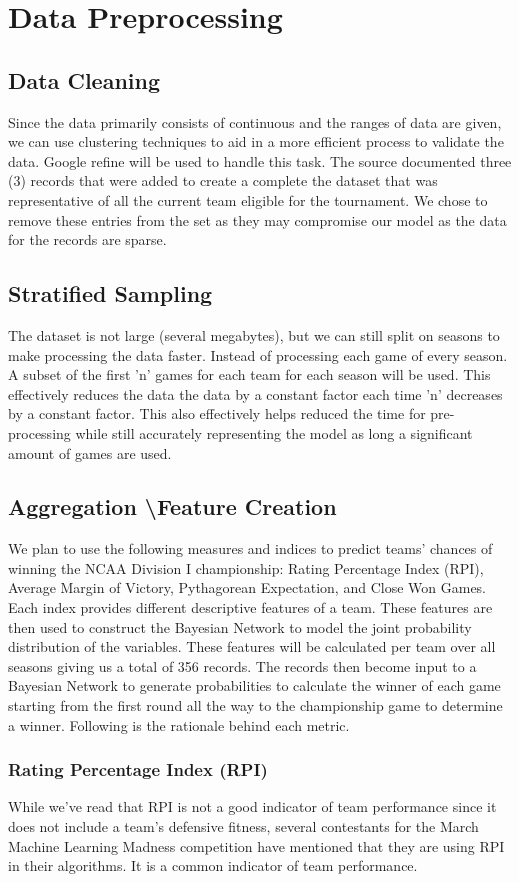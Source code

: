 \documentclass{acm_proc_article-sp}
\begin{document}
\section{Data Preprocessing}
\subsection{Data Cleaning}
Since the data primarily consists of continuous and the ranges of data are given, we can use 
clustering techniques to aid in a more efficient process to validate the data. Google refine will be 
used to handle this task. The source documented three (3) records that were added to create a 
complete the dataset that was representative of all the current team eligible for the tournament. We 
chose to remove these entries from the set as they may compromise our model as the data for the 
records are sparse.
\subsection{Stratified Sampling}
The dataset is not large (several megabytes), but we can still split on seasons to make processing 
the data faster. Instead of processing each game of every season. A subset of the first 'n' games 
for each team for each season will be used. This effectively reduces the data the data by a constant 
factor each time 'n' decreases by a constant factor. This also effectively helps reduced the time 
for pre-processing while still accurately representing the model as long a significant amount of 
games are used.
\subsection{Aggregation \textbackslash Feature Creation}
We plan to use the following measures and indices to predict teams' chances of winning the NCAA 
Division I championship: Rating Percentage Index (RPI), Average Margin of Victory, Pythagorean 
Expectation, and Close Won Games. Each index provides different descriptive features of a team. 
These features are then used to construct the Bayesian Network to model the joint probability 
distribution of the variables. These features will be calculated per team over all seasons giving us 
a total of 356 records. The records then become input to a Bayesian Network to generate 
probabilities to calculate the winner of each game starting from the first round all the way to the 
championship game to determine a winner. Following is the rationale behind each metric.
\subsubsection{Rating Percentage Index (RPI)}
While we've read that RPI is not a good indicator of team performance since it does not include a 
team's defensive fitness\cite{mozell}, several contestants for the March Machine Learning Madness 
competition have mentioned that they are using RPI in their algorithms.\cite{sonas, crowson, 
covalytics} It is a common indicator of team performance.
\end{document}
